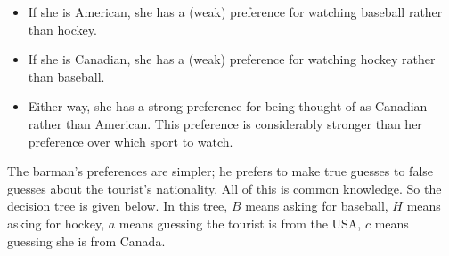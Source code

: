 \documentclass[openany]{book}
\begin{document}
\begin{itemize}
\item If she is American, she has a (weak) preference for watching baseball rather than hockey.
\item If she is Canadian, she has a (weak) preference for watching hockey rather than baseball.
\item Either way, she has a strong preference for being thought of as Canadian rather than American. This preference is considerably stronger than her preference over which sport to watch.
\end{itemize}
The barman's preferences are simpler; he prefers to make true guesses to false guesses about the tourist's nationality. All of this is common knowledge. So the decision tree is given below. In this tree, $B$ means asking for baseball, $H$ means asking for hockey, $a$ means guessing the tourist is from the USA, $c$ means guessing she is from Canada.
\end{document}
